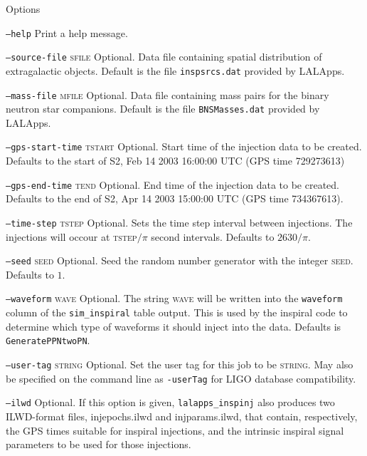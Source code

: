 \begin{entry}
\item[Options]\leavevmode
\begin{entry}
\item[\texttt{--help}] Print a help message.

\item[\texttt{--source-file} \textsc{sfile}]
Optional. Data file containing spatial distribution of  extragalactic  objects.
Default  is  the file \verb+inspsrcs.dat+ provided by LALApps.

\item[\texttt{--mass-file} \textsc{mfile}]
Optional. Data file containing mass pairs  for  the binary  neutron  star
companions.   Default is the file \verb+BNSMasses.dat+ provided by LALApps.

\item[\texttt{--gps-start-time} \textsc{tstart}]
Optional.  Start time of the injection data to be created. Defaults to the
start of S2, Feb 14 2003 16:00:00 UTC (GPS time 729273613)

\item[\texttt{--gps-end-time} \textsc{tend}]
Optional. End time of the injection data to be created. Defaults to the end of
S2, Apr 14 2003 15:00:00 UTC (GPS time 734367613).

\item[\texttt{--time-step} \textsc{tstep}]
Optional. Sets the time step interval between injections. The injections will
occour at \textsc{tstep}$/\pi$ second intervals. Defaults to $2630/\pi$.

\item[\texttt{--seed} \textsc{seed}]
Optional. Seed the random number generator with the integer \textsc{seed}.
Defaults to $1$.

\item[\texttt{--waveform} \textsc{wave}]
Optional. The string \textsc{wave} will be written into the \texttt{waveform}
column of the \texttt{sim\_inspiral} table output. This is used by the
inspiral code to determine which type of waveforms it should inject into the
data. Defaults is \texttt{GeneratePPNtwoPN}.

\item[\texttt{--user-tag} \textsc{string}] Optional. Set the user tag for this
job to be \textsc{string}. May also be specified on the command line as 
\texttt{-userTag} for LIGO database compatibility.

\item[\texttt{--ilwd}] Optional. If this option is given,
\verb+lalapps_inspinj+ also produces two ILWD-format files, injepochs.ilwd and
injparams.ilwd, that contain, respectively, the  GPS  times  suitable for
inspiral injections, and the intrinsic inspiral signal parameters to be used
for  those injections.


\end{entry}
\end{entry}
